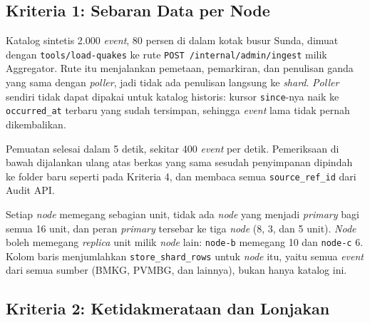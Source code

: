 \subsection{Kriteria 1: Sebaran Data per Node}

Katalog sintetis 2.000 \textit{event}, 80 persen di dalam kotak busur Sunda, dimuat dengan \texttt{tools/load-quakes} ke rute \texttt{POST /internal/admin/ingest} milik Aggregator. Rute itu menjalankan pemetaan, pemarkiran, dan penulisan ganda yang sama dengan \textit{poller}, jadi tidak ada penulisan langsung ke \textit{shard}. \textit{Poller} sendiri tidak dapat dipakai untuk katalog historis: kursor \texttt{since}-nya naik ke \texttt{occurred\_at} terbaru yang sudah tersimpan, sehingga \textit{event} lama tidak pernah dikembalikan.

Pemuatan selesai dalam 5 detik, sekitar 400 \textit{event} per detik. Pemeriksaan di bawah dijalankan ulang atas berkas yang sama sesudah penyimpanan dipindah ke folder baru seperti pada Kriteria 4, dan membaca semua \texttt{source\_ref\_id} dari Audit API.


Setiap \textit{node} memegang sebagian unit, tidak ada \textit{node} yang menjadi \textit{primary} bagi semua 16 unit, dan peran \textit{primary} tersebar ke tiga \textit{node} (8, 3, dan 5 unit). \textit{Node} boleh memegang \textit{replica} unit milik \textit{node} lain: \texttt{node-b} memegang 10 dan \texttt{node-c} 6. Kolom baris menjumlahkan \texttt{store\_shard\_rows} untuk \textit{node} itu, yaitu semua \textit{event} dari semua sumber (BMKG, PVMBG, dan lainnya), bukan hanya katalog ini.

\subsection{Kriteria 2: Ketidakmerataan dan Lonjakan}

